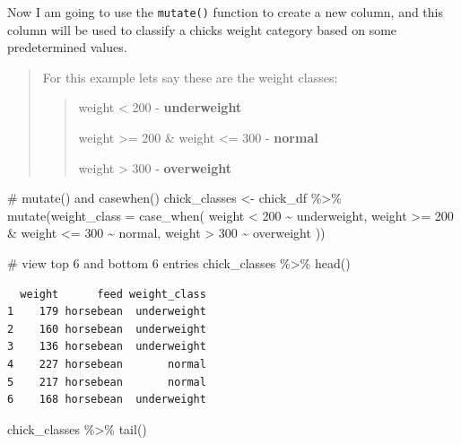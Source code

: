 \documentclass[
  letterpaper,
  DIV=11,
  numbers=noendperiod]{scrreprt}
\newenvironment{Shaded}{\begin{snugshade}}{\end{snugshade}}
\newcommand{\AttributeTok}[1]{\textcolor[rgb]{0.40,0.45,0.13}{#1}}
\newcommand{\CommentTok}[1]{\textcolor[rgb]{0.37,0.37,0.37}{#1}}
\newcommand{\DecValTok}[1]{\textcolor[rgb]{0.68,0.00,0.00}{#1}}
\newcommand{\FunctionTok}[1]{\textcolor[rgb]{0.28,0.35,0.67}{#1}}
\newcommand{\NormalTok}[1]{\textcolor[rgb]{0.00,0.23,0.31}{#1}}
\newcommand{\OtherTok}[1]{\textcolor[rgb]{0.00,0.23,0.31}{#1}}
\newcommand{\SpecialCharTok}[1]{\textcolor[rgb]{0.37,0.37,0.37}{#1}}
\newcommand{\StringTok}[1]{\textcolor[rgb]{0.13,0.47,0.30}{#1}}
\begin{document}
Now I am going to use the \texttt{mutate()} function to create a new
column, and this column will be used to classify a chicks weight
category based on some predetermined values.

\begin{quote}
For this example lets say these are the weight classes:

\begin{quote}
weight \textless{} 200 - \textbf{underweight}

weight \textgreater= 200 \& weight \textless= 300 - \textbf{normal}

weight \textgreater{} 300 - \textbf{overweight}
\end{quote}
\end{quote}

\begin{Shaded}
\begin{Highlighting}[]
\CommentTok{\# mutate() and casewhen()}
\NormalTok{chick\_classes }\OtherTok{\textless{}{-}}\NormalTok{ chick\_df }\SpecialCharTok{\%\textgreater{}\%}
  \FunctionTok{mutate}\NormalTok{(}\AttributeTok{weight\_class =} \FunctionTok{case\_when}\NormalTok{(}
\NormalTok{    weight }\SpecialCharTok{\textless{}} \DecValTok{200} \SpecialCharTok{\textasciitilde{}} \StringTok{\textquotesingle{}underweight\textquotesingle{}}\NormalTok{,}
\NormalTok{    weight }\SpecialCharTok{\textgreater{}=} \DecValTok{200} \SpecialCharTok{\&}\NormalTok{ weight }\SpecialCharTok{\textless{}=} \DecValTok{300} \SpecialCharTok{\textasciitilde{}} \StringTok{\textquotesingle{}normal\textquotesingle{}}\NormalTok{,}
\NormalTok{    weight }\SpecialCharTok{\textgreater{}} \DecValTok{300} \SpecialCharTok{\textasciitilde{}} \StringTok{\textquotesingle{}overweight\textquotesingle{}}
\NormalTok{    ))}

\CommentTok{\# view top 6 and bottom 6 entries}
\NormalTok{chick\_classes }\SpecialCharTok{\%\textgreater{}\%} \FunctionTok{head}\NormalTok{()}
\end{Highlighting}
\end{Shaded}

\begin{verbatim}
  weight      feed weight_class
1    179 horsebean  underweight
2    160 horsebean  underweight
3    136 horsebean  underweight
4    227 horsebean       normal
5    217 horsebean       normal
6    168 horsebean  underweight
\end{verbatim}

\begin{Shaded}
\begin{Highlighting}[]
\NormalTok{chick\_classes }\SpecialCharTok{\%\textgreater{}\%} \FunctionTok{tail}\NormalTok{()}
\end{Highlighting}
\end{Shaded}
\end{document}
